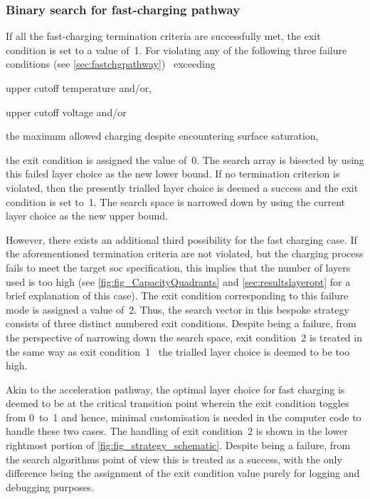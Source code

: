 \subsubsection*{Binary search for fast-charging pathway}

If all  the fast-charging  termination criteria are  successfully met,  the exit
condition is  set to  a value  of~1. For  violating any  of the  following three
failure conditions (see \cref{sec:fastchgpathway}) \viz~exceeding
\begin{enumerate*}[label=\itshape\alph*\upshape)]
    \item upper cutoff temperature  and/or,
    \item upper cutoff voltage and/or
    \item the maximum allowed charging despite encountering surface saturation,
\end{enumerate*}
the exit condition is  assigned the value of~0. The search  array is bisected by
using  this failed  layer  choice as  the  new lower  bound.  If no  termination
criterion is  violated, then  the presently  trialled layer  choice is  deemed a
success and the exit condition is set to~1. The search space is narrowed down by
using the current layer choice as the new upper bound.

However,  there exists  an additional  third possibility  for the  fast charging
case.  If the  aforementioned termination  criteria  are not  violated, but  the
charging process fails to meet  the target \gls{soc} specification, this implies
that the number of layers used is too high (see \cref{fig:fig_CapacityQuadrants}
and \cref{sec:resultslayeropt} for  a brief explanation of this  case). The exit
condition corresponding to this failure mode is assigned a value of~2. Thus, the
search vector in this bespoke strategy  consists of three distinct numbered exit
conditions. Despite being a failure, from  the perspective of narrowing down the
search space,  exit condition~2 is treated  in the same way  as exit condition~1
\ie~the trialled layer choice is deemed to be too high.

Akin to the acceleration pathway, the  optimal layer choice for fast charging is
deemed to be at the critical transition point wherein the exit condition toggles
from 0~to~1 and  hence, minimal customisation is needed in  the computer code to
handle these two cases.  The handling of exit condition~2 is  shown in the lower
rightmost portion of \cref{fig:fig_strategy_schematic}. Despite being a failure,
from the search algorithms point of view  this is treated as a success, with the
only difference  being the  assignment of  the exit  condition value  purely for
logging and debugging purposes.

